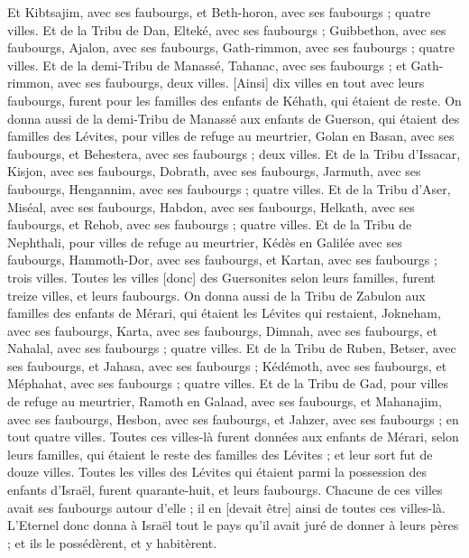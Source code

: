 \begin{multicols}{2}
Et Kibtsajim, avec ses faubourgs, et Beth-horon, avec ses faubourgs ; quatre villes.
Et de la Tribu de Dan, Elteké, avec ses faubourgs ; Guibbethon, avec ses faubourgs,
Ajalon, avec ses faubourgs, Gath-rimmon, avec ses faubourgs ; quatre villes.
Et de la demi-Tribu de Manassé, Tahanac, avec ses faubourgs ; et Gath-rimmon, avec ses faubourgs, deux villes.
[Ainsi] dix villes en tout avec leurs faubourgs, furent pour les familles des enfants de Kéhath, qui étaient de reste.
On donna aussi de la demi-Tribu de Manassé aux enfants de Guerson, qui étaient des familles des Lévites, pour villes de refuge au meurtrier, Golan en Basan, avec ses faubourgs, et Behestera, avec ses faubourgs ; deux villes.
Et de la Tribu d'Issacar, Kisjon, avec ses faubourgs, Dobrath, avec ses faubourgs,
Jarmuth, avec ses faubourgs, Hengannim, avec ses faubourgs ; quatre villes.
Et de la Tribu d'Aser, Miséal, avec ses faubourgs, Habdon, avec ses faubourgs,
Helkath, avec ses faubourgs, et Rehob, avec ses faubourgs ; quatre villes.
Et de la Tribu de Nephthali, pour villes de refuge au meurtrier, Kédès en Galilée avec ses faubourgs, Hammoth-Dor, avec ses faubourgs, et Kartan, avec ses faubourgs ; trois villes.
Toutes les villes [donc] des Guersonites selon leurs familles, furent treize villes, et leurs faubourgs.
On donna aussi de la Tribu de Zabulon aux familles des enfants de Mérari, qui étaient les Lévites qui restaient, Jokneham, avec ses faubourgs, Karta, avec ses faubourgs,
Dimnah, avec ses faubourgs, et Nahalal, avec ses faubourgs ; quatre villes.
Et de la Tribu de Ruben, Betser, avec ses faubourgs, et Jahasa, avec ses faubourgs ;
Kédémoth, avec ses faubourgs, et Méphahat, avec ses faubourgs ; quatre villes.
Et de la Tribu de Gad, pour villes de refuge au meurtrier, Ramoth en Galaad, avec ses faubourgs, et Mahanajim, avec ses faubourgs,
Hesbon, avec ses faubourgs, et Jahzer, avec ses faubourgs ; en tout quatre villes.
Toutes ces villes-là furent données aux enfants de Mérari, selon leurs familles, qui étaient le reste des familles des Lévites ; et leur sort fut de douze villes.
Toutes les villes des Lévites qui étaient parmi la possession des enfants d'Israël, furent quarante-huit, et leurs faubourgs.
Chacune de ces villes avait ses faubourgs autour d'elle ; il en [devait être] ainsi de toutes ces villes-là.
L'Eternel donc donna à Israël tout le pays qu'il avait juré de donner à leurs pères ; et ils le possédèrent, et y habitèrent.

\end{multicols}
